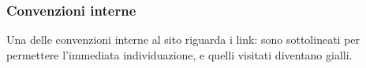 \subsubsection{Convenzioni interne}
\label{ssub:convenzioni_interne}
Una delle convenzioni interne al sito riguarda i link: sono sottolineati per permettere l'immediata individuazione, e quelli visitati diventano gialli. %

